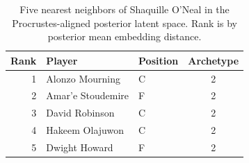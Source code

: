 \begin{table}[htbp]
  \centering\small
  \begin{tabular}{rllc}
    \toprule
    Rank & Player & Position & Archetype \\
    \midrule
    1 & Alonzo Mourning & C & 2 \\
    2 & Amar'e Stoudemire & F & 2 \\
    3 & David Robinson & C & 2 \\
    4 & Hakeem Olajuwon & C & 2 \\
    5 & Dwight Howard & F & 2 \\
    \bottomrule
  \end{tabular}
  \caption{Five nearest neighbors of Shaquille O'Neal in the Procrustes-aligned posterior latent space. Rank is by posterior mean embedding distance.}
  \label{tab:Shaquille_O_Neal_neighbors}
\end{table}


